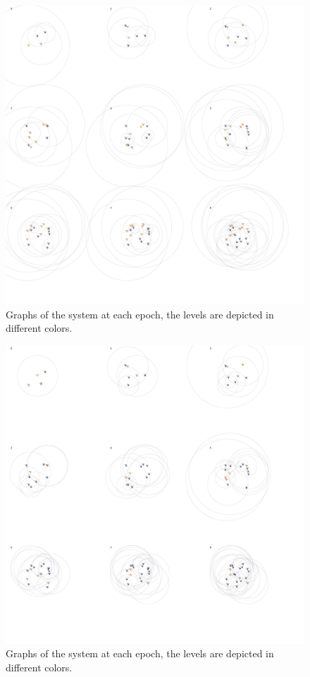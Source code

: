 \documentclass[a4paper,11pt,oneside]{report}
\begin{document}
\begin{figure}[!h] 
\centering
\includegraphics[width=350pt]{figures/LocarnoTreaties-RandomFinal}
\caption{Graphs of the system at each epoch, the levels are depicted in different colors.}
\label{fig:LocarnoTreaties-RandomFinal}
\end{figure}

\begin{figure}[!h] 
\centering
\includegraphics[width=500pt]{figures/LocarnoTreaties-LocarnoFinal}
\caption{Graphs of the system at each epoch, the levels are depicted in different colors.}
\label{fig:LocarnoTreaties-LocarnoFinal}
\end{figure}
\end{document}
